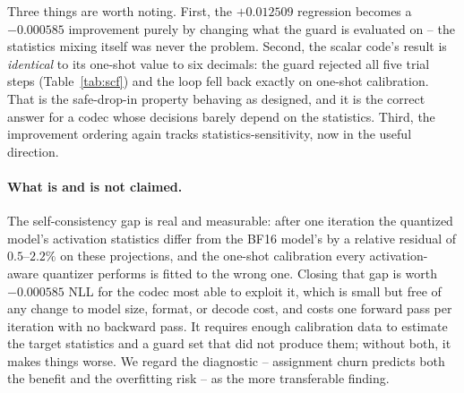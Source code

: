 Three things are worth noting. First, the $+0.012509$ regression becomes a
$-0.000585$ improvement purely by changing what the guard is evaluated on --
the statistics mixing itself was never the problem. Second, the scalar code's
result is \emph{identical} to its one-shot value to six decimals: the guard
rejected all five trial steps (Table~\ref{tab:scf}) and the loop fell back
exactly on one-shot calibration. That is the safe-drop-in property behaving as designed, and it is
the correct answer for a codec whose decisions barely depend on the statistics.
Third, the improvement ordering again tracks statistics-sensitivity, now in the
useful direction.

\paragraph{What is and is not claimed.} The self-consistency gap is real and
measurable: after one iteration the quantized model's activation statistics
differ from the BF16 model's by a relative residual of $0.5$--$2.2\%$ on these
projections, and the one-shot calibration every activation-aware quantizer
performs is fitted to the wrong one. Closing that gap is worth $-0.000585$ NLL
for the codec most able to exploit it, which is small but free of any change to
model size, format, or decode cost, and costs one forward pass per iteration
with no backward pass. It requires enough calibration data to estimate the
target statistics and a guard set that did not produce them; without both, it
makes things worse. We regard the diagnostic -- assignment churn predicts both
the benefit and the overfitting risk -- as the more transferable finding.
